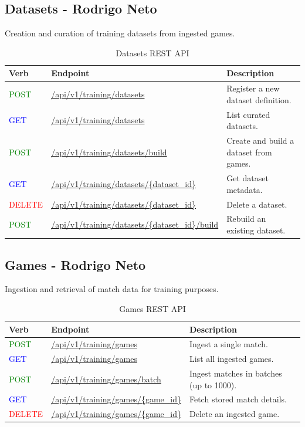 \documentclass[11pt,a4paper]{article}
\newcommand{\postapi}{\textcolor{green}{POST}}
\newcommand{\getapi}{\textcolor{blue}{GET}}
\newcommand{\deleteapi}{\textcolor{red}{DELETE}}
\newcommand{\training}[1]{/api/v1/training#1}
\newcommand{\bff}[1]{\textbf{#1}}
\begin{document}
 \newpage
 \subsection{Datasets - Rodrigo Neto}

 Creation and curation of training datasets from ingested games.

 \begin{table}[H]
 \begin{tabular}{|p{2cm}|p{5cm}|p{7cm}|}
 \hline
 \bff{Verb} & \bff{Endpoint}        & \bff{Description} \\ \hline
 \postapi & \url{\training/datasets}      & Register a new dataset definition. \\ \hline
 \getapi & \url{\training/datasets}      & List curated datasets. \\ \hline
 \postapi & \url{\training/datasets/build}    & Create and build a dataset from games. \\ \hline
 \getapi & \url{\training/datasets/{dataset\_id}}  & Get dataset metadata. \\ \hline
 \deleteapi & \url{\training/datasets/{dataset\_id}}  & Delete a dataset. \\ \hline
 \postapi & \url{\training/datasets/{dataset\_id}/build} & Rebuild an existing dataset. \\ \hline
 \end{tabular}
 \caption{Datasets REST API}
 \label{tab:api-datasets}
 \end{table}

 \subsection{Games - Rodrigo Neto}

 Ingestion and retrieval of match data for training purposes.

 \begin{table}[H]
 \begin{tabular}{|p{2cm}|p{5cm}|p{7cm}|}
 \hline
 \bff{Verb} & \bff{Endpoint}     & \bff{Description} \\ \hline
 \postapi & \url{\training/games}   & Ingest a single match. \\ \hline
 \getapi & \url{\training/games}   & List all ingested games. \\ \hline
 \postapi & \url{\training/games/batch}   & Ingest matches in batches (up to 1000). \\ \hline
 \getapi & \url{\training/games/{game\_id}} & Fetch stored match details. \\ \hline
 \deleteapi & \url{\training/games/{game\_id}} & Delete an ingested game. \\ \hline
 \end{tabular}
 \caption{Games REST API}
 \label{tab:api-games}
 \end{table}
\end{document}
